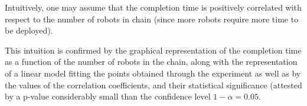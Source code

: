 Intuitively, one may assume that the completion time is positively correlated with respect to the number of robots in chain (since more robots require more time to be deployed).

This intuition is confirmed by the graphical representation of the completion time as a function of the number of robots in the chain, along with the representation of a linear model fitting the points obtained through the experiment as well as by the values of the correlation coefficients, and their statistical significance (attested by a p-value considerably small than the confidence level $1-\alpha=0.05$.



